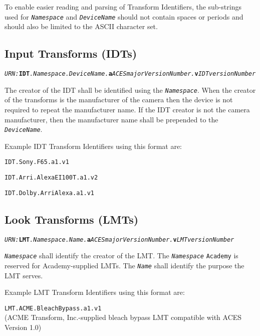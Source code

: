 To enable easier reading and parsing of Transform Identifiers, the sub-strings used for \texttt{\textit{Namespace}} and \texttt{\textit{DeviceName}} should not contain spaces or periods and should also be limited to the ASCII character set.

\subsection{Input Transforms (IDTs)}

\texttt{\textit{URN:}\textbf{IDT}\textit{.Namespace.DeviceName.}\textbf{a}\textit{ACESmajorVersionNumber.}\textbf{v}\textit{IDTversionNumber}}

The creator of the IDT shall be identified using the \texttt{\textit{Namespace}}. When the creator of the transforms is the manufacturer of the camera then the device is not required to repeat the manufacturer name.  If the IDT creator is not the camera manufacturer, then the manufacturer name shall be prepended to the \texttt{\textit{DeviceName}}.

Example IDT Transform Identifiers using this format are: 
\begin{listize}
	\item {\small\texttt{\urn{}IDT.Sony.F65.a1.v1}}
	\item {\small\texttt{\urn{}IDT.Arri.AlexaEI100T.a1.v2}}
	\item {\small \texttt{\urn{}IDT.Dolby.ArriAlexa.a1.v1}}
\end{listize}

\subsection{Look Transforms (LMTs)}

\texttt{\textit{URN:}\textbf{LMT}\textit{.Namespace.Name.}\textbf{a}\textit{ACESmajorVersionNumber.}\textbf{v}\textit{LMTversionNumber}}

\texttt{\textit{Namespace}} shall identify the creator of the LMT. The \texttt{\textit{Namespace}} \texttt{Academy} is reserved for Academy-supplied LMTs. The \texttt{\textit{Name}} shall identify the purpose the LMT serves.

Example LMT Transform Identifiers using this format are: 
\begin{listize}
	\item \texttt{\urn{}LMT.ACME.BleachBypass.a1.v1}\\(ACME Transform, Inc.-supplied bleach bypass LMT compatible with ACES Version 1.0)
\end{listize}

